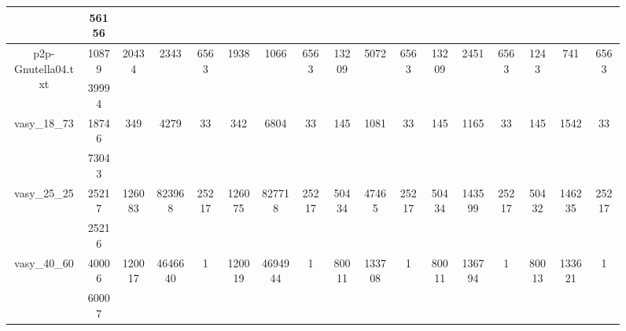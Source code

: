 \documentclass[../master/master.tex]{subfiles}
\begin{document}
\begin{figure}
\begin{adjustbox}{angle=90}
\begin{tabular}{ |c|c||c|c|c||c|c|c||c|c|c||c|c|c||c|c|c|| }
\cline{2-2}
 & 56156  &  &  &  &  &  &  &  &  &  &  &  &  &  &  &  \\
\hline
\multirow{2}{3.6em}{p2p-Gnutella04.txt} & 10879 & \multirow{2}{3.6em}{20434} & \multirow{2}{3.6em}{2343} & \multirow{2}{3.6em}{6563} & \multirow{2}{3.6em}{1938} & \multirow{2}{3.6em}{1066} & \multirow{2}{3.6em}{6563} & \multirow{2}{3.6em}{13209} & \multirow{2}{3.6em}{5072} & \multirow{2}{3.6em}{6563} & \multirow{2}{3.6em}{13209} & \multirow{2}{3.6em}{2451} & \multirow{2}{3.6em}{6563} & \multirow{2}{3.6em}{1243} & \multirow{2}{3.6em}{741} & \multirow{2}{3.6em}{6563} \\
\cline{2-2}
 & 39994  &  &  &  &  &  &  &  &  &  &  &  &  &  &  &  \\
\hline
\multirow{2}{3.6em}{vasy\_18\_73} & 18746 & \multirow{2}{3.6em}{349} & \multirow{2}{3.6em}{4279} & \multirow{2}{3.6em}{33} & \multirow{2}{3.6em}{342} & \multirow{2}{3.6em}{6804} & \multirow{2}{3.6em}{33} & \multirow{2}{3.6em}{145} & \multirow{2}{3.6em}{1081} & \multirow{2}{3.6em}{33} & \multirow{2}{3.6em}{145} & \multirow{2}{3.6em}{1165} & \multirow{2}{3.6em}{33} & \multirow{2}{3.6em}{145} & \multirow{2}{3.6em}{1542} & \multirow{2}{3.6em}{33} \\
\cline{2-2}
 & 73043  &  &  &  &  &  &  &  &  &  &  &  &  &  &  &  \\
\hline
\multirow{2}{3.6em}{vasy\_25\_25} & 25217 & \multirow{2}{3.6em}{126083} & \multirow{2}{3.6em}{823968} & \multirow{2}{3.6em}{25217} & \multirow{2}{3.6em}{126075} & \multirow{2}{3.6em}{827718} & \multirow{2}{3.6em}{25217} & \multirow{2}{3.6em}{50434} & \multirow{2}{3.6em}{47465} & \multirow{2}{3.6em}{25217} & \multirow{2}{3.6em}{50434} & \multirow{2}{3.6em}{143599} & \multirow{2}{3.6em}{25217} & \multirow{2}{3.6em}{50432} & \multirow{2}{3.6em}{146235} & \multirow{2}{3.6em}{25217} \\
\cline{2-2}
 & 25216  &  &  &  &  &  &  &  &  &  &  &  &  &  &  &  \\
\hline
\multirow{2}{3.6em}{vasy\_40\_60} & 40006 & \multirow{2}{3.6em}{120017} & \multirow{2}{3.6em}{4646640} & \multirow{2}{3.6em}{1} & \multirow{2}{3.6em}{120019} & \multirow{2}{3.6em}{4694944} & \multirow{2}{3.6em}{1} & \multirow{2}{3.6em}{80011} & \multirow{2}{3.6em}{133708} & \multirow{2}{3.6em}{1} & \multirow{2}{3.6em}{80011} & \multirow{2}{3.6em}{136794} & \multirow{2}{3.6em}{1} & \multirow{2}{3.6em}{80013} & \multirow{2}{3.6em}{133621} & \multirow{2}{3.6em}{1} \\
\cline{2-2}
 & 60007  &  &  &  &  &  &  &  &  &  &  &  &  &  &  &  \\

\end{tabular}
\end{adjustbox}
\end{figure}
\end{document}
